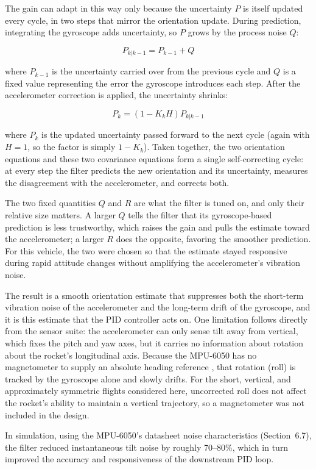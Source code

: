 The gain can adapt in this way only because the uncertainty $P$ is itself updated every cycle, in two steps that mirror the orientation update. During prediction, integrating the gyroscope adds uncertainty, so $P$ grows by the process noise $Q$:
 
\[
P_{k|k-1} = P_{k-1} + Q
\]
 
where $P_{k-1}$ is the uncertainty carried over from the previous cycle and $Q$ is a fixed value representing the error the gyroscope introduces each step. After the accelerometer correction is applied, the uncertainty shrinks:
 
\[
P_k = \left(1 - K_k H\right) P_{k|k-1}
\]
 
where $P_k$ is the updated uncertainty passed forward to the next cycle (again with $H = 1$, so the factor is simply $1 - K_k$). Taken together, the two orientation equations and these two covariance equations form a single self-correcting cycle: at every step the filter predicts the new orientation and its uncertainty, measures the disagreement with the accelerometer, and corrects both.
 
The two fixed quantities $Q$ and $R$ are what the filter is tuned on, and only their relative size matters. A larger $Q$ tells the filter that its gyroscope-based prediction is less trustworthy, which raises the gain and pulls the estimate toward the accelerometer; a larger $R$ does the opposite, favoring the smoother prediction. For this vehicle, the two were chosen so that the estimate stayed responsive during rapid attitude changes without amplifying the accelerometer's vibration noise.
 
The result is a smooth orientation estimate that suppresses both the short-term vibration noise of the accelerometer and the long-term drift of the gyroscope, and it is this estimate that the PID controller acts on. One limitation follows directly from the sensor suite: the accelerometer can only sense tilt away from vertical, which fixes the pitch and yaw axes, but it carries no information about rotation about the rocket's longitudinal axis. Because the MPU-6050 has no magnetometer to supply an absolute heading reference \cite{invensense_mpu6050}, that rotation (roll) is tracked by the gyroscope alone and slowly drifts. For the short, vertical, and approximately symmetric flights considered here, uncorrected roll does not affect the rocket's ability to maintain a vertical trajectory, so a magnetometer was not included in the design.
 
In simulation, using the MPU-6050's datasheet noise characteristics (Section~6.7), the filter reduced instantaneous tilt noise by roughly 70--80\%, which in turn improved the accuracy and responsiveness of the downstream PID loop.

